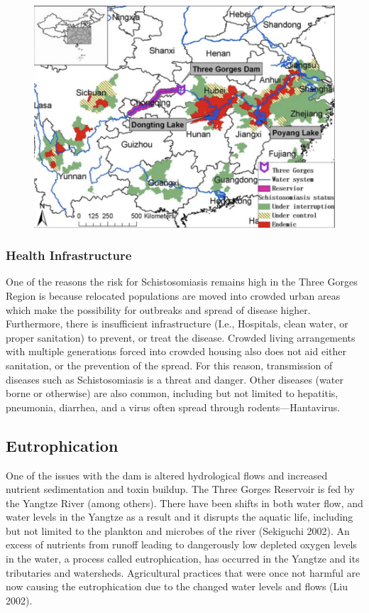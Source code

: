 \documentclass{book}\usepackage{knitr}
\begin{document}
\begin{figure}
\includegraphics[width=\textwidth]{images/schis-map.png}
\caption{}
\label{fig:help}
\end{figure}

\subsubsection{Health Infrastructure}

  One of the reasons the risk for Schistosomiasis remains high in the Three Gorges Region is because relocated populations are moved into crowded urban areas which make the possibility for outbreaks and spread of disease higher. Furthermore, there is insufficient infrastructure (I.e., Hospitals, clean water, or proper sanitation) to prevent, or treat the disease. Crowded living arrangements with multiple generations forced into crowded housing also does not aid either sanitation, or the prevention of the spread. For this reason, transmission of diseases such as Schistosomiasis is a threat and danger. Other diseases (water borne or otherwise) are also common, including but not limited to hepatitis, pneumonia, diarrhea, and a virus often spread through rodents—Hantavirus. 

\subsection{Eutrophication}

  One of the issues with the dam is altered hydrological flows and increased nutrient sedimentation and toxin buildup. The Three Gorges Reservoir is fed by the Yangtze River (among others). There have been shifts in both water flow, and water levels in the Yangtze as a result and it disrupts the aquatic life, including but not limited to the plankton and microbes of the river (Sekiguchi 2002). An excess of nutrients from runoff leading to dangerously low depleted oxygen levels in the water, a process called eutrophication, has occurred in the Yangtze and its tributaries and watersheds. Agricultural practices that were once not harmful are now causing the eutrophication due to the changed water levels and flows (Liu 2002). 
\end{document}
